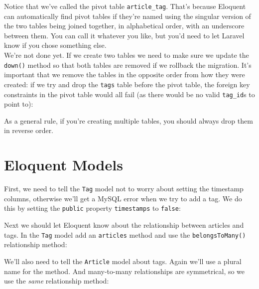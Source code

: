 
Notice that we've called the pivot table \texttt{article\_tag}. That's because Eloquent can automatically find pivot tables if they're named using the singular version of the two tables being joined together, in alphabetical order, with an underscore between them. You can call it whatever you like, but you'd need to let Laravel know if you chose something else.
\\

We're not done yet. If we create two tables we need to make sure we update the \texttt{down()} method so that both tables are removed if we rollback the migration. It's important that we remove the tables in the opposite order from how they were created: if we try and drop the \texttt{tags} table before the pivot table, the foreign key constraints in the pivot table would all fail (as there would be no valid \texttt{tag\_id}s to point to):


As a general rule, if you're creating multiple tables, you should always drop them in reverse order.


\section{Eloquent Models}

First, we need to tell the \texttt{Tag} model not to worry about setting the timestamp columns, otherwise we'll get a MySQL error when we try to add a tag. We do this by setting the \texttt{public} property \texttt{timestamps} to \texttt{false}:


Next we should let Eloquent know about the relationship between articles and tags. In the \texttt{Tag} model add an \texttt{articles} method and use the \texttt{belongsToMany()} relationship method:


We'll also need to tell the \texttt{Article} model about tags. Again we'll use a plural name for the method. And many-to-many relationships are symmetrical, so we use the \textit{same} relationship method:



